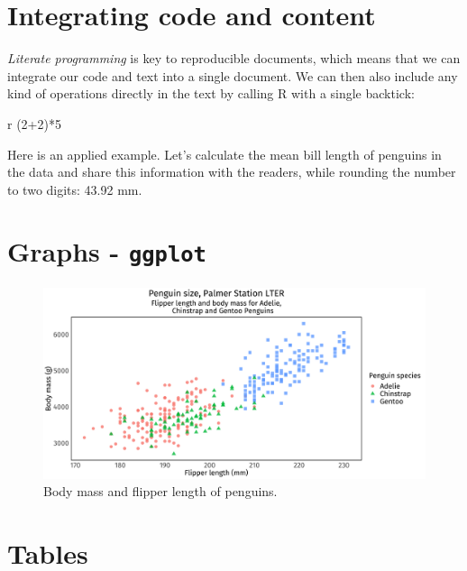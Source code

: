 \documentclass[
  11pt,
]{scrartcl}
\newenvironment{Shaded}{\begin{snugshade}}{\end{snugshade}}
\newcommand{\AttributeTok}[1]{\textcolor[rgb]{0.77,0.63,0.00}{#1}}
\newcommand{\StringTok}[1]{\textcolor[rgb]{0.31,0.60,0.02}{#1}}
\begin{document}
\hypertarget{integrating-code-and-content}{%
\section{Integrating code and content}\label{integrating-code-and-content}}

\emph{Literate programming} is key to reproducible documents, which means that we can integrate our code and text into a single document. We can then also include any kind of operations directly in the text by calling R with a single backtick:

\begin{Shaded}
\begin{Highlighting}[]
\StringTok{\textasciigrave{}}\AttributeTok{r (2+2)*5}\StringTok{\textasciigrave{}}
\end{Highlighting}
\end{Shaded}

Here is an applied example. Let's calculate the mean bill length of penguins in the data and share this information with the readers, while rounding the number to two digits: 43.92 mm.

\newpage

\hypertarget{graphs---ggplot}{%
\section{\texorpdfstring{Graphs - \texttt{ggplot}}{Graphs - ggplot}}\label{graphs---ggplot}}

\begin{figure}

{\centering \includegraphics[width=0.9\linewidth]{figs/figggplot-1} 

}

\caption{Body mass and flipper length of penguins.}\label{fig:ggplot}
\end{figure}

\hypertarget{tables}{%
\section{Tables}\label{tables}}
\end{document}
